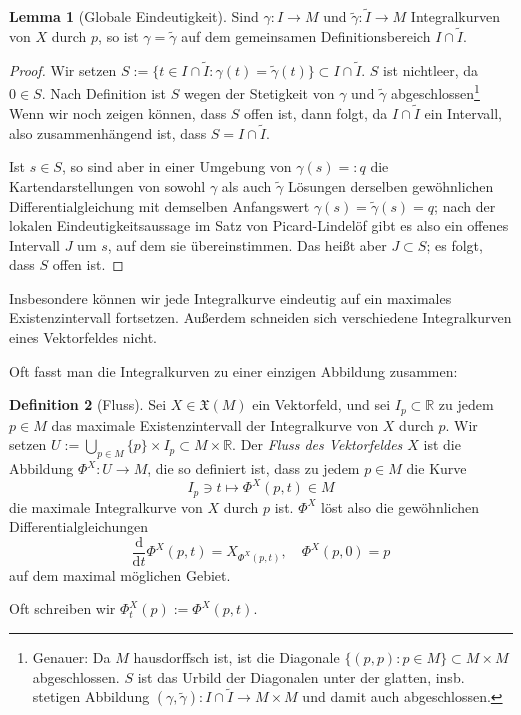 \documentclass[a4paper]{scrreprt}
\numberwithin{equation}{chapter}
\newcommand{\D}{\mathrm{d}}
\newcommand{\R}{\mathbb{R}}
\theoremstyle{definition}
\newtheorem{defn}{Definition}[section]
\newtheorem{lemma}[defn]{Lemma}
\begin{document}
\begin{lemma}[Globale Eindeutigkeit]
	Sind $\gamma\colon I \to M$ und $\tilde\gamma\colon \tilde I \to M$ Integralkurven von $X$ durch $p$, so ist $\gamma = \tilde \gamma$ auf dem gemeinsamen Definitionsbereich $I \cap \tilde I$.

	\begin{proof}
		Wir setzen $S := \{t \in I \cap \tilde I: \gamma(t) = \tilde \gamma(t)\} \subset I \cap \tilde I$. $S$ ist nichtleer, da $0 \in S$. Nach Definition ist $S$ wegen der Stetigkeit von $\gamma$ und $\tilde \gamma$ abgeschlossen\footnote{Genauer: Da $M$ hausdorffsch ist, ist die Diagonale $\{(p,p) : p \in M\} \subset M \times M$ abgeschlossen. $S$ ist das Urbild der Diagonalen unter der glatten, insb. stetigen Abbildung $(\gamma,\tilde \gamma) \colon I \cap \tilde I \to M \times M$ und damit auch abgeschlossen.} Wenn wir noch zeigen können, dass $S$ offen ist, dann folgt, da $I \cap \tilde I$ ein Intervall, also zusammenhängend ist, dass $S = I \cap \tilde I$.

		Ist $s \in S$, so sind aber in einer Umgebung von $\gamma(s) =: q$ die Kartendarstellungen von sowohl $\gamma$ als auch $\tilde \gamma$ Lösungen derselben gewöhnlichen Differentialgleichung mit demselben Anfangswert $\gamma(s) = \tilde\gamma(s) = q$; nach der lokalen Eindeutigkeitsaussage im Satz von Picard-Lindelöf gibt es also ein offenes Intervall $J$ um $s$, auf dem sie übereinstimmen. Das heißt aber $J \subset S$; es folgt, dass $S$ offen ist.
	\end{proof}
\end{lemma}
Insbesondere können wir jede Integralkurve eindeutig auf ein maximales Existenzintervall fortsetzen. Außerdem schneiden sich verschiedene Integralkurven eines Vektorfeldes nicht.

Oft fasst man die Integralkurven zu einer einzigen Abbildung zusammen:
\begin{defn}[Fluss]
	Sei $X \in \mathfrak X(M)$ ein Vektorfeld, und sei $I_p \subset \R$ zu jedem $p \in M$ das maximale Existenzintervall der Integralkurve von $X$ durch $p$. Wir setzen $U := \bigcup_{p\in M} \{p\}\times I_p \subset M \times \R$. Der \emph{Fluss des Vektorfeldes $X$} ist die Abbildung $\Phi^X\colon U \to M$, die so definiert ist, dass zu jedem $p \in M$ die Kurve
	\[I_p \ni t \mapsto \Phi^X(p,t) \in M\]
	die maximale Integralkurve von $X$ durch $p$ ist. $\Phi^X$ löst also die gewöhnlichen Differentialgleichungen
	\[\frac{\D}{\D t} \Phi^X(p,t) = X_{\Phi^X(p,t)}, \quad \Phi^X(p,0) = p\]
	auf dem maximal möglichen Gebiet.

	Oft schreiben wir $\Phi^X_t(p) := \Phi^X(p,t)$.
\end{defn}
\end{document}
